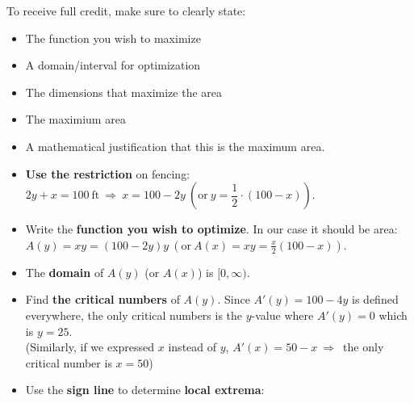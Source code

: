 \documentclass[11pt]{article}
\begin{document}
\begin{enumerate}




To receive full credit, make sure to clearly state:

\begin{itemize}
    \item The function you wish to maximize\\
    \item A domain/interval for optimization\\
    \item The dimensions that maximize the area\\
    \item The maximium area\\
    \item A mathematical justification that this is the maximum area.
\end{itemize}
{\color{blue}
\begin{itemize}
\item
\textbf{Use the restriction} on fencing:
$2y+x=100\ \text{ft}\ \Longrightarrow\ x=100-2y\
\left(\text{or}\ y=\dfrac{1}{2}\cdot(100-x)\right)$.
\item
Write the \textbf{function you wish to optimize}.
In our case it should be area:\\
$A(y) = xy = (100-2y)y\
\left(\text{or}\
A(x) = xy = \frac{x}{2} (100-x)
\right)$.
\item
The \textbf{domain} of $A(y)$
(or $A(x)$) is $[0,\infty)$.
\item
Find \textbf{the critical numbers} of $A(y)$.
Since $A'(y)=100-4y$ is defined everywhere, the only critical numbers is the $y$-value where $A'(y)=0$
which is $y=25$.\\
(Similarly, if we expressed $x$ instead of $y$,
$A'(x)=50-x\ \Longrightarrow$\
the only critical number is $x=50$)
\item
Use the \textbf{sign line} to determine \textbf{local extrema}:
\begin{table}[h!]
    \centering

\end{table}
\end{itemize}}
\end{enumerate}
\end{document}
